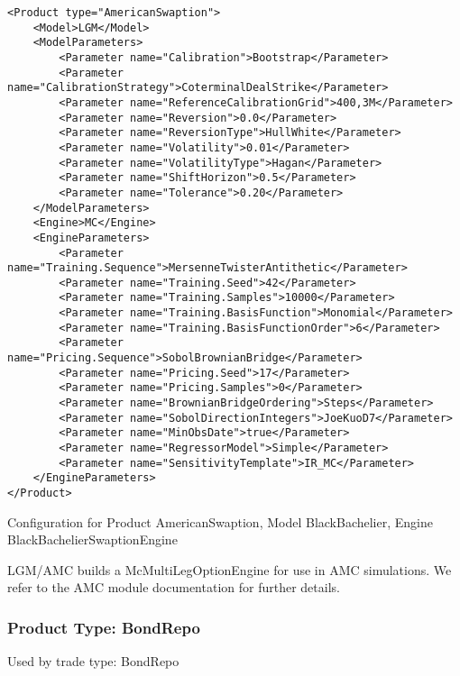 \begin{longlisting}
\begin{verbatim}
<Product type="AmericanSwaption">
    <Model>LGM</Model>
    <ModelParameters>
        <Parameter name="Calibration">Bootstrap</Parameter>
        <Parameter name="CalibrationStrategy">CoterminalDealStrike</Parameter>
        <Parameter name="ReferenceCalibrationGrid">400,3M</Parameter>
        <Parameter name="Reversion">0.0</Parameter>
        <Parameter name="ReversionType">HullWhite</Parameter>
        <Parameter name="Volatility">0.01</Parameter>
        <Parameter name="VolatilityType">Hagan</Parameter>
        <Parameter name="ShiftHorizon">0.5</Parameter>
        <Parameter name="Tolerance">0.20</Parameter>
    </ModelParameters>
    <Engine>MC</Engine>
    <EngineParameters>
        <Parameter name="Training.Sequence">MersenneTwisterAntithetic</Parameter>
        <Parameter name="Training.Seed">42</Parameter>
        <Parameter name="Training.Samples">10000</Parameter>
        <Parameter name="Training.BasisFunction">Monomial</Parameter>
        <Parameter name="Training.BasisFunctionOrder">6</Parameter>
        <Parameter name="Pricing.Sequence">SobolBrownianBridge</Parameter>
        <Parameter name="Pricing.Seed">17</Parameter>
        <Parameter name="Pricing.Samples">0</Parameter>
        <Parameter name="BrownianBridgeOrdering">Steps</Parameter>
        <Parameter name="SobolDirectionIntegers">JoeKuoD7</Parameter>
        <Parameter name="MinObsDate">true</Parameter>
        <Parameter name="RegressorModel">Simple</Parameter>
        <Parameter name="SensitivityTemplate">IR_MC</Parameter>
    </EngineParameters>
</Product>
\end{verbatim}
\caption{Configuration for Product AmericanSwaption, Model BlackBachelier, Engine BlackBachelierSwaptionEngine}
\label{lst:peconfig_AmericanSwaption_LGM_MC}
\end{longlisting}

LGM/AMC builds a McMultiLegOptionEngine for use in AMC simulations. We refer to the AMC module documentation for further
details.

\subsubsection{Product Type: BondRepo}

Used by trade type: BondRepo

